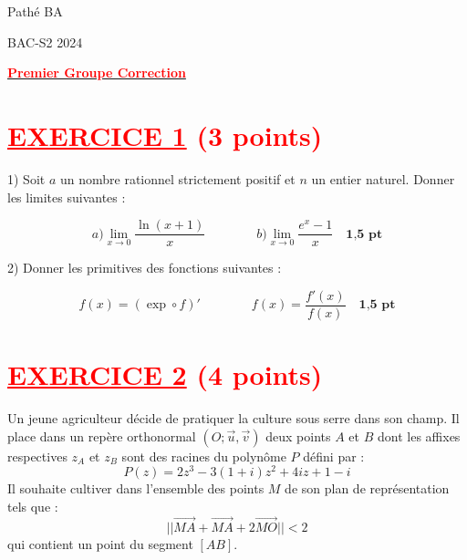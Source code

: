 \documentclass[12pt]{article}
\begin{document}
\begin{minipage}{0.8\textwidth}
	Pathé BA                          
\end{minipage}
\begin{minipage}{0.8\textwidth}
	BAC-S2 2024
\end{minipage}

\begin{center}
\textbf{{\underline{\textcolor{red}{Premier Groupe Correction}}}}
\end{center}





\section*{\textcolor{red}{\underline{EXERCICE 1} (3 points) }}
1) Soit \(a\) un nombre rationnel strictement positif et \(n\) un entier naturel. Donner les limites suivantes :

\[
a) \lim_{x \to 0} \frac{\ln(x+1)}{x}\quad\quad\quad\quad b) \lim_{x \to 0} \frac{e^x - 1}{x}\quad \textbf{1,5 pt} \]


2) Donner les primitives des fonctions suivantes :

\[
 f(x) = ( \exp \circ f)' \quad\quad\quad\quad f(x) = \frac{f'(x)}{f(x)}  \quad \textbf{1,5 pt}
\]

\section*{\textcolor{red}{\underline{EXERCICE 2} (4 points) }}
Un jeune agriculteur décide de pratiquer la culture sous serre dans son champ. Il place dans un repère orthonormal \( (O; \vec{u}, \vec{v}) \) deux points \( A \) et \( B \) dont les affixes respectives \( z_A \) et \( z_B \) sont des racines du polynôme \( P \) défini par :
\[
P(z) = 2z^3 - 3(1+i)z^2 + 4iz + 1 - i
\]
Il souhaite cultiver dans l'ensemble des points \( M \) de son plan de représentation tels que :
\[
||\overrightarrow{MA} + \overrightarrow{MA} + 2\overrightarrow{MO}|| < 2
\]
qui contient un point du segment \( [AB] \).
\end{document}
